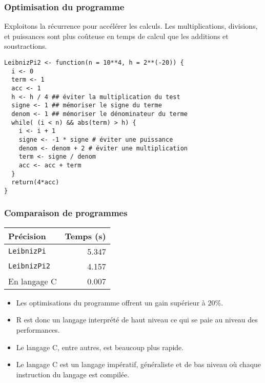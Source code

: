 \documentclass[10pt]{beamer}
\begin{document}
\begin{frame}[fragile]
  \frametitle{Optimisation du programme}
  \begin{alertblock}{Exploitons la récurrence pour accélérer les calculs.}
    \alert{Les multiplications, divisions, et puissances sont plus coûteuse en temps de calcul que les additions et soustractions.}
  \end{alertblock}

  \begin{lstlisting}
LeibnizPi2 <- function(n = 10**4, h = 2**(-20)) {
  i <- 0
  term <- 1
  acc <- 1
  h <- h / 4 ## éviter la multiplication du test
  signe <- 1 ## mémoriser le signe du terme
  denom <- 1 ## mémoriser le dénominateur du terme
  while( (i < n) && abs(term) > h) {
    i <- i + 1
    signe <- -1 * signe # éviter une puissance
    denom <- denom + 2 # éviter une multiplication
    term <- signe / denom
    acc <- acc + term
  }
  return(4*acc)
}

  \end{lstlisting}
\end{frame}

\begin{frame}
  \frametitle{Comparaison de programmes}


    \begin{table}[h]
    \centering
    \begin{tabular}{lr}
      \toprule
      Précision           & Temps (s) \\
      \midrule
      \texttt{LeibnizPi}  & 5.347     \\
      \texttt{LeibnizPi2} & 4.157     \\
      En langage C        & 0.007     \\
             \bottomrule
    \end{tabular}
  \end{table}

  \begin{itemize}
  \item Les optimisations du programme offrent un gain supérieur à $20\%$.
  \item R est donc un langage interprété de haut niveau ce qui se paie au niveau des performances.
  \item Le langage C, entre autres, est beaucoup plus rapide.
  \item Le langage C est un langage impératif, généraliste et de bas niveau où chaque instruction du langage est compilée.
  \end{itemize}

\end{frame}
\end{document}
